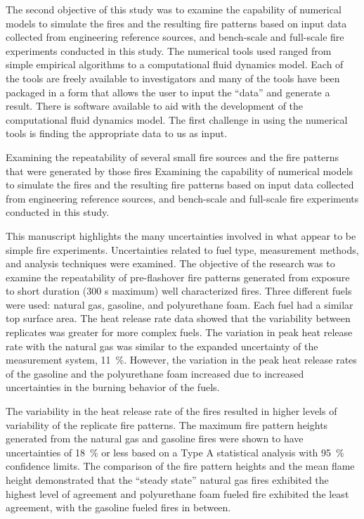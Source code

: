 \documentclass[twoside]{uocthesis}
\begin{document}
{The second objective of this study was to examine the capability of numerical models to simulate the fires and the resulting fire patterns based on input data collected from engineering reference sources, and bench-scale and full-scale fire experiments conducted in this study.  The numerical tools used ranged from simple empirical algorithms to a computational fluid dynamics model.  Each of the tools are freely available to investigators and many of the tools have been packaged in a form that allows the user to input the ``data'' and generate a result.  There is software available to aid with the development of the computational fluid dynamics model.  The first challenge in using the numerical tools is finding the appropriate data to us as input.        


Examining the repeatability of several small fire sources and the fire patterns that were generated by those fires
Examining the capability of numerical models to simulate the fires and the resulting fire patterns based on input data collected from engineering reference sources, and bench-scale and full-scale fire experiments conducted in this study.

This manuscript highlights the many uncertainties involved in what appear to be simple fire experiments.  Uncertainties related to fuel type, measurement methods, and analysis techniques were examined.  The objective of the research was to examine the repeatability of pre-flashover fire patterns generated from exposure to short duration (300 s maximum) well characterized fires.  Three different fuels were used: natural gas, gasoline, and polyurethane foam.  Each fuel had a similar top surface area.  The heat release rate data showed that the variability between replicates was greater for more complex fuels.  The variation in peak heat release rate with the natural gas was similar to the expanded uncertainty of the measurement system, 11~\%.  However, the variation in the peak heat release rates of the gasoline and the polyurethane foam increased due to increased uncertainties in the burning behavior of the fuels.  

The variability in the heat release rate of the fires resulted in higher levels of variability of the replicate fire patterns. The maximum fire pattern heights generated from the natural gas and gasoline fires were shown to have uncertainties of 18~\% or less based on a Type A statistical analysis with 95~\% confidence limits.  The comparison of the fire pattern heights and the mean flame height demonstrated that the ``steady state'' natural gas fires exhibited the highest level of agreement and polyurethane foam fueled fire exhibited the least agreement, with the gasoline fueled fires in between. 

}
\end{document}
